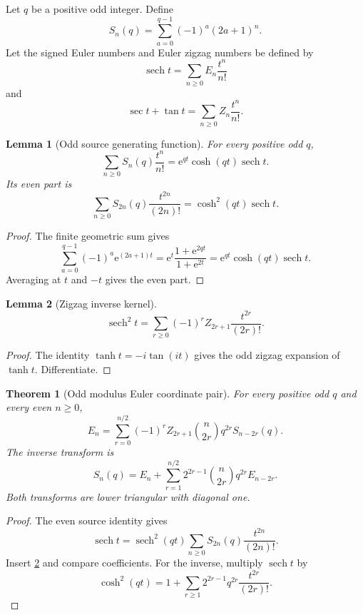 \documentclass{aomart}
\newtheorem{theorem}{Theorem}[section]
\newtheorem{lemma}[lemma]{Lemma}
\theoremstyle{definition}
\theoremstyle{remark}
\newcommand{\e}{\mathrm e}
\begin{document}
Let \(q\) be a positive odd integer. Define
\[
S_n(q)
=
\sum_{a=0}^{q-1}
(-1)^a(2a+1)^n.
\]
Let the signed Euler numbers and Euler zigzag numbers be defined by
\[
\operatorname{sech}t
=
\sum_{n\geq0}E_n\frac{t^n}{n!}
\]
and
\[
\sec t+\tan t
=
\sum_{n\geq0}Z_n\frac{t^n}{n!}.
\]

\begin{lemma}[Odd source generating function]\label{lem:odd_source_egf}
For every positive odd \(q\),
\[
\boxed{
\sum_{n\geq0}S_n(q)\frac{t^n}{n!}
=
\e^{qt}\cosh(qt)\operatorname{sech}t.
}
\]
Its even part is
\[
\boxed{
\sum_{n\geq0}S_{2n}(q)\frac{t^{2n}}{(2n)!}
=
\cosh^2(qt)\operatorname{sech}t.
}
\]
\end{lemma}

\begin{proof}
The finite geometric sum gives
\[
\sum_{a=0}^{q-1}(-1)^a\e^{(2a+1)t}
=
\e^t\frac{1+\e^{2qt}}{1+\e^{2t}}
=
\e^{qt}\cosh(qt)\operatorname{sech}t.
\]
Averaging at \(t\) and \(-t\) gives the even part.
\end{proof}

\begin{lemma}[Zigzag inverse kernel]\label{lem:local_zigzag_kernel}
\[
\boxed{
\operatorname{sech}^2t
=
\sum_{r\geq0}
(-1)^rZ_{2r+1}
\frac{t^{2r}}{(2r)!}.
}
\]
\end{lemma}

\begin{proof}
The identity \(\tanh t=-i\tan(it)\) gives the odd zigzag expansion of \(\tanh t\). Differentiate.
\end{proof}

\begin{theorem}[Odd modulus Euler coordinate pair]\label{thm:odd_coordinate_pair}
For every positive odd \(q\) and every even \(n\geq0\),
\[
\boxed{
E_n
=
\sum_{r=0}^{n/2}
(-1)^rZ_{2r+1}
\binom n{2r}
q^{2r}S_{n-2r}(q).
}
\]
The inverse transform is
\[
\boxed{
S_n(q)
=
E_n
+
\sum_{r=1}^{n/2}
2^{2r-1}
\binom n{2r}
q^{2r}E_{n-2r}.
}
\]
Both transforms are lower triangular with diagonal one.
\end{theorem}

\begin{proof}
The even source identity gives
\[
\operatorname{sech}t
=
\operatorname{sech}^2(qt)
\sum_{n\geq0}S_{2n}(q)\frac{t^{2n}}{(2n)!}.
\]
Insert \cref{lem:local_zigzag_kernel} and compare coefficients. For the inverse, multiply \(\operatorname{sech}t\) by
\[
\cosh^2(qt)
=
1+
\sum_{r\geq1}2^{2r-1}q^{2r}\frac{t^{2r}}{(2r)!}.
\]
\end{proof}
\end{document}
